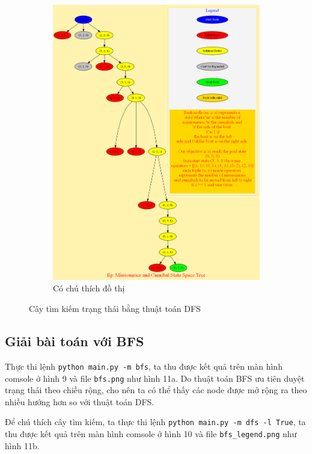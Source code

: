 \documentclass[a4paper, 11pt]{article}
\begin{document}
\begin{figure}
\begin{subfigure}[b]{0.5\textwidth}
        \includegraphics[width=\textwidth]{dfs_legend.png}
        \caption{Có chú thích đồ thị}
    \end{subfigure}
    \caption{Cây tìm kiếm trạng thái bằng thuật toán DFS}
\end{figure}

\subsection{Giải bài toán với BFS}

Thực thi lệnh \lstinline|python main.py -m bfs|, ta thu được kết quả trên màn hình comsole ở hình 9 và file \lstinline|bfs.png| như hình 11a. Do thuật toán BFS ưu tiên duyệt trạng thái theo chiều rộng, cho nên ta có thể thấy các node được mở rộng ra theo nhiều hướng hơn so với thuật toán DFS.

Để chú thích cây tìm kiếm, ta thực thi lệnh \lstinline|python main.py -m dfs -l True|, ta thu được kết quả trên màn hình comsole ở hình 10 và file \lstinline|bfs_legend.png| như hình 11b.
\end{document}

